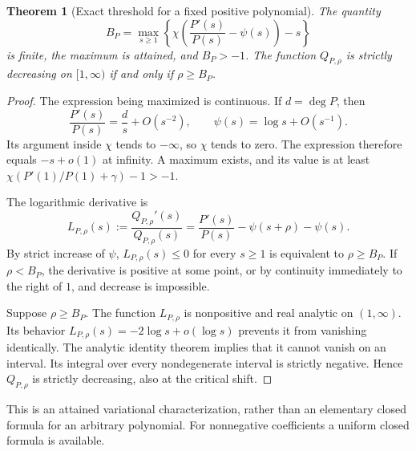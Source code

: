 \documentclass[11pt,a4paper]{article}
\newtheorem{theorem}{Theorem}[section]
\theoremstyle{definition}
\theoremstyle{remark}
\numberwithin{equation}{section}
\begin{document}
\begin{theorem}[Exact threshold for a fixed positive polynomial]
\label{p1:thm:fixed-poly-threshold}
The quantity
\[
 B_P=\max_{s\ge1}\left\{
 \chi\!\left(\frac{P'(s)}{P(s)}-\psi(s)\right)-s\right\}
\]
is finite, the maximum is attained, and $B_P>-1$. The function $Q_{P,\rho}$ is strictly decreasing on $[1,\infty)$ if and only if $\rho\ge B_P$.
\end{theorem}
\begin{proof}
The expression being maximized is continuous. If $d=\deg P$, then
\[
 \frac{P'(s)}{P(s)}=\frac ds+O(s^{-2}),\qquad
 \psi(s)=\log s+O(s^{-1}).
\]
Its argument inside $\chi$ tends to $-\infty$, so $\chi$ tends to zero. The expression therefore equals $-s+o(1)$ at infinity. A maximum exists, and its value is at least
$\chi(P'(1)/P(1)+\gamma)-1>-1$.

The logarithmic derivative is
\[
 L_{P,\rho}(s):=\frac{Q_{P,\rho}'(s)}{Q_{P,\rho}(s)}
 =\frac{P'(s)}{P(s)}-\psi(s+\rho)-\psi(s).
\]
By strict increase of $\psi$, $L_{P,\rho}(s)\le0$ for every $s\ge1$ is equivalent to $\rho\ge B_P$. If $\rho<B_P$, the derivative is positive at some point, or by continuity immediately to the right of $1$, and decrease is impossible.

Suppose $\rho\ge B_P$. The function $L_{P,\rho}$ is nonpositive and real analytic on $(1,\infty)$. Its behavior $L_{P,\rho}(s)=-2\log s+o(\log s)$ prevents it from vanishing identically. The analytic identity theorem implies that it cannot vanish on an interval. Its integral over every nondegenerate interval is strictly negative. Hence $Q_{P,\rho}$ is strictly decreasing, also at the critical shift.
\end{proof}

This is an attained variational characterization, rather than an elementary closed formula for an arbitrary polynomial. For nonnegative coefficients a uniform closed formula is available.
\end{document}
